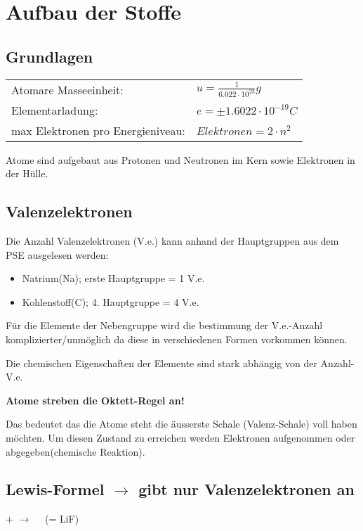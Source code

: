 \section{Aufbau der Stoffe}

\subsection{Grundlagen}
\begin{tabular}{ll}
    Atomare Masseeinheit:&$u = \frac{1}{6.022\cdot10^{23}}g$\\
    Elementarladung:&$e = \pm 1.6022 \cdot 10^{-19}C$\\
    max Elektronen pro Energieniveau:&$Elektronen = 2 \cdot n^{2}$
\end{tabular}

Atome sind aufgebaut aus Protonen und Neutronen im Kern sowie Elektronen in der Hülle.

\subsection{Valenzelektronen}
Die Anzahl Valenzelektronen (V.e.) kann anhand der Hauptgruppen aus dem PSE ausgelesen werden:
\begin{itemize}
    \item Natrium(Na); erste Hauptgruppe = 1 V.e.
    \item Kohlenstoff(C); 4. Hauptgruppe = 4 V.e.
\end{itemize}  
Für die Elemente der Nebengruppe wird die bestimmung der V.e.-Anzahl komplizierter/unmöglich da diese in verschiedenen Formen vorkommen können.

Die chemischen Eigenschaften der Elemente sind stark abhängig von der Anzahl-V.e. 

\textbf{Atome streben die Oktett-Regel an!}

Das bedeutet das die Atome steht die äusserste Schale (Valenz-Schale) voll haben möchten. 
Um diesen Zustand zu erreichen werden Elektronen aufgenommen oder abgegeben(chemische Reaktion).

\subsection{Lewis-Formel $\rightarrow$ gibt nur Valenzelektronen an}
\begin{center}
     +
    $\longrightarrow$
    $\quad$(= LiF)
\end{center}
